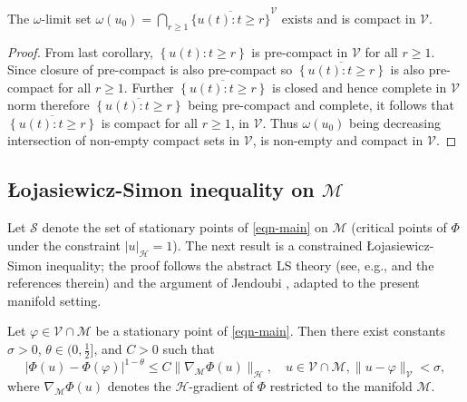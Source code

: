 \documentclass[reqno]{amsart}
\begin{document}
\begin{corollary}\label{omega}
The $\omega$-limit set
$\omega(u_0)=\bigcap_{r\ge1}\overline{\{u(t):t\ge r\}}^{\mathcal{V}}$ exists and
is compact in $\mathcal{V}$.
\end{corollary}

\begin{proof}
From last corollary, $\left\{ u(t):t\geq r\right\} $ is pre-compact in $\mathcal{V}$
for all $r\geq 1$. Since closure of pre-compact is also pre-compact so
$\overline{\left\{ u(t):t\geq r\right\} }$ is also pre-compact for all
 $r\geq1 $. Further $\overline{\left\{ u(t):t\geq r\right\} }$ is closed and hence
complete in $\mathcal{V}$ norm therefore $\overline{\left\{ u(t):t\geq r\right\} }$
being pre-compact and complete, it follows that $\overline{\left\{ u(t):t\geq r\right\} }$ is compact for all $r\geq 1$, in $\mathcal{V}$. Thus $\omega (u_{0})$ being decreasing intersection of
non-empty compact sets in $\mathcal{V}$, is non-empty and compact in $\mathcal{V}$.
\end{proof}

\subsection*{\L{o}jasiewicz-Simon inequality on $\mathcal{M}$}
Let $\mathcal{S}$ denote the set of stationary points of \eqref{eqn-main} on
$\mathcal{M}$ (critical points of $\Phi$ under the constraint $|u|_{\mathcal{H}}=1$).
The next result is a constrained \L{o}jasiewicz-Simon inequality; the proof follows
the abstract LS theory (see, e.g., \cite{Songu} and the references therein) and the
argument of Jendoubi \cite{Jendoubi}, adapted to the present manifold setting.

\begin{theorem}\label{Lwoj}
Let $\varphi\in \mathcal V\cap\mathcal M$ be a stationary point of \eqref{eqn-main}.
Then there exist constants $\sigma>0$, $\theta\in(0,\tfrac12]$, and $C>0$ such that
\begin{equation}\label{eq:LS}
|\Phi(u)-\Phi(\varphi)|^{1-\theta}\le C \|\nabla_{\mathcal M}\Phi(u)\|_{\mathcal H},
\quad
u\in \mathcal V\cap\mathcal M, \|u-\varphi\|_{\mathcal V}<\sigma,
\end{equation}
where $\nabla_{\mathcal M}\Phi(u)$ denotes the $\mathcal H$-gradient of $\Phi$
restricted to the manifold $\mathcal M$.
\end{theorem}
\end{document}
